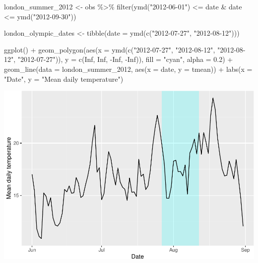 \documentclass[
]{book}
\newenvironment{Shaded}{\begin{snugshade}}{\end{snugshade}}
\newcommand{\AttributeTok}[1]{\textcolor[rgb]{0.77,0.63,0.00}{#1}}
\newcommand{\ConstantTok}[1]{\textcolor[rgb]{0.00,0.00,0.00}{#1}}
\newcommand{\FloatTok}[1]{\textcolor[rgb]{0.00,0.00,0.81}{#1}}
\newcommand{\FunctionTok}[1]{\textcolor[rgb]{0.00,0.00,0.00}{#1}}
\newcommand{\NormalTok}[1]{#1}
\newcommand{\OtherTok}[1]{\textcolor[rgb]{0.56,0.35,0.01}{#1}}
\newcommand{\SpecialCharTok}[1]{\textcolor[rgb]{0.00,0.00,0.00}{#1}}
\newcommand{\StringTok}[1]{\textcolor[rgb]{0.31,0.60,0.02}{#1}}
\begin{document}
\begin{Shaded}
\begin{Highlighting}[]
\NormalTok{london\_summer\_2012 }\OtherTok{\textless{}{-}}\NormalTok{ obs }\SpecialCharTok{\%\textgreater{}\%} 
  \FunctionTok{filter}\NormalTok{(}\FunctionTok{ymd}\NormalTok{(}\StringTok{"2012{-}06{-}01"}\NormalTok{) }\SpecialCharTok{\textless{}=}\NormalTok{ date }\SpecialCharTok{\&}\NormalTok{ date }\SpecialCharTok{\textless{}=} \FunctionTok{ymd}\NormalTok{(}\StringTok{"2012{-}09{-}30"}\NormalTok{))}

\NormalTok{london\_olympic\_dates }\OtherTok{\textless{}{-}} \FunctionTok{tibble}\NormalTok{(}\AttributeTok{date =} \FunctionTok{ymd}\NormalTok{(}\FunctionTok{c}\NormalTok{(}\StringTok{"2012{-}07{-}27"}\NormalTok{, }\StringTok{"2012{-}08{-}12"}\NormalTok{)))}

\FunctionTok{ggplot}\NormalTok{() }\SpecialCharTok{+} 
  \FunctionTok{geom\_polygon}\NormalTok{(}\FunctionTok{aes}\NormalTok{(}\AttributeTok{x =} \FunctionTok{ymd}\NormalTok{(}\FunctionTok{c}\NormalTok{(}\StringTok{"2012{-}07{-}27"}\NormalTok{, }\StringTok{"2012{-}08{-}12"}\NormalTok{, }
                             \StringTok{"2012{-}08{-}12"}\NormalTok{, }\StringTok{"2012{-}07{-}27"}\NormalTok{)), }
                   \AttributeTok{y =} \FunctionTok{c}\NormalTok{(}\ConstantTok{Inf}\NormalTok{, }\ConstantTok{Inf}\NormalTok{, }\SpecialCharTok{{-}}\ConstantTok{Inf}\NormalTok{, }\SpecialCharTok{{-}}\ConstantTok{Inf}\NormalTok{)), }\AttributeTok{fill =} \StringTok{"cyan"}\NormalTok{, }\AttributeTok{alpha =} \FloatTok{0.2}\NormalTok{) }\SpecialCharTok{+} 
  \FunctionTok{geom\_line}\NormalTok{(}\AttributeTok{data =}\NormalTok{ london\_summer\_2012, }\FunctionTok{aes}\NormalTok{(}\AttributeTok{x =}\NormalTok{ date, }\AttributeTok{y =}\NormalTok{ tmean)) }\SpecialCharTok{+} 
  \FunctionTok{labs}\NormalTok{(}\AttributeTok{x =} \StringTok{"Date"}\NormalTok{, }\AttributeTok{y =} \StringTok{"Mean daily temperature"}\NormalTok{)}
\end{Highlighting}
\end{Shaded}

\includegraphics{adv_epi_analysis_files/figure-latex/unnamed-chunk-63-1.pdf}
\end{document}
